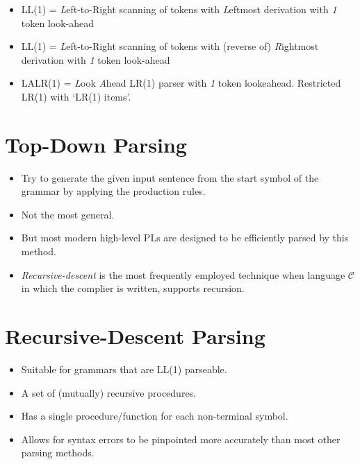 \documentclass[a4paper]{scrartcl}
\theoremstyle{definition}
\begin{document}
\begin{itemize}
	\item LL(1) = \emph{L}eft-to-Right scanning of tokens with \emph{L}eftmost derivation with \emph{1} token look-ahead
	\item LL(1) = \emph{L}eft-to-Right scanning of tokens with (reverse of) \emph{R}ightmost derivation with \emph{1} token look-ahead
	\item LALR(1) = \emph{L}ook \emph{A}head LR(1) parser with \emph{1} token lookeahead. Restricted LR(1) with `LR(1) items'.
\end{itemize}

\section{Top-Down Parsing}
\begin{itemize}
	\item Try to generate the given input sentence from the start symbol of the grammar by applying the production rules.
	\item Not the most general.
	\item But most modern high-level PLs are designed to be efficiently parsed by this method.
	\item \emph{Recursive-descent} is the most frequently employed technique when language $\mathcal{C}$ in which the complier is written, supports recursion.
\end{itemize}

\section{Recursive-Descent Parsing}
\begin{itemize}
	\item Suitable for grammars that are LL(1) parseable.
	\item A set of (mutually) recursive procedures.
	\item Has a single procedure/function for each non-terminal symbol.
	\item Allows for syntax errors to be pinpointed more accurately than most other parsing methods.
\end{itemize}
\end{document}
